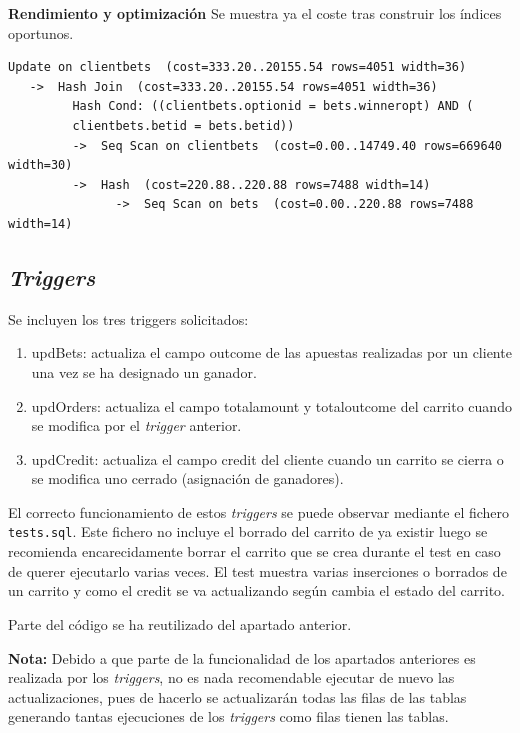 \documentclass{article}
\begin{document}
$$\;$$

\textbf{Rendimiento y optimización}
Se muestra ya el coste tras construir los índices oportunos.
\begin{lstlisting}[style=sql]
 Update on clientbets  (cost=333.20..20155.54 rows=4051 width=36)
   ->  Hash Join  (cost=333.20..20155.54 rows=4051 width=36)
         Hash Cond: ((clientbets.optionid = bets.winneropt) AND (
         clientbets.betid = bets.betid))
         ->  Seq Scan on clientbets  (cost=0.00..14749.40 rows=669640 width=30)
         ->  Hash  (cost=220.88..220.88 rows=7488 width=14)
               ->  Seq Scan on bets  (cost=0.00..220.88 rows=7488 width=14)
\end{lstlisting}

\subsection{\textit{Triggers}}
Se incluyen los tres triggers solicitados:
\begin{enumerate}
    \item updBets: actualiza el campo outcome de las apuestas realizadas por un cliente una vez se ha designado un ganador.
    \item updOrders: actualiza el campo totalamount y totaloutcome del carrito cuando se modifica por el \textit{trigger} anterior.
    \item updCredit: actualiza el campo credit del cliente cuando un carrito se cierra o se modifica uno cerrado (asignación de ganadores).
\end{enumerate}

El correcto funcionamiento de estos \textit{triggers} se puede observar mediante el fichero \texttt{tests.sql}. Este fichero no incluye el borrado del carrito de ya existir luego se recomienda encarecidamente borrar el carrito que se crea durante el test en caso de querer ejecutarlo varias veces. El test muestra varias inserciones o borrados de un carrito y como el credit se va actualizando según cambia el estado del carrito.

Parte del código se ha reutilizado del apartado anterior.

\textbf{Nota:} Debido a que parte de la funcionalidad de los apartados anteriores es realizada por los \textit{triggers}, no es nada recomendable ejecutar de nuevo las actualizaciones, pues de hacerlo se actualizarán todas las filas de las tablas generando tantas ejecuciones de los \textit{triggers} como filas tienen las tablas.
\end{document}
